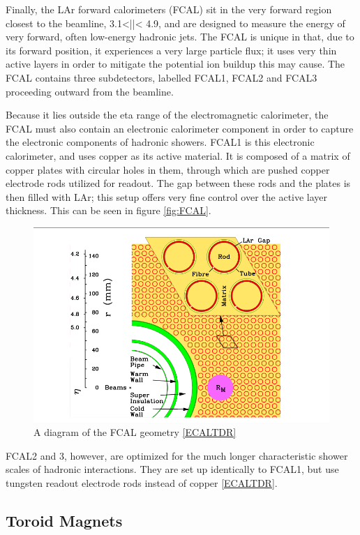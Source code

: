 Finally, the LAr forward calorimeters (FCAL) sit in the very forward region closest to the beamline, 3.1<|\eta |< 4.9, and are designed to measure the energy of very forward, often low-energy hadronic jets.  The FCAL is unique in that, due to its forward position, it experiences a very large particle flux; it uses very thin active layers in order to mitigate the potential ion buildup this may cause.  The FCAL contains three subdetectors, labelled FCAL1, FCAL2 and FCAL3 proceeding outward from the beamline.

Because it lies outside the eta range of the electromagnetic calorimeter, the FCAL must also contain an electronic calorimeter component in order to capture the electronic components of hadronic showers. FCAL1 is this electronic calorimeter, and uses copper as its active material. It is composed of a matrix of copper plates with circular holes in them, through which are pushed copper electrode rods utilized for readout. The gap between these rods and the plates is then filled with LAr; this setup offers very fine control over the active layer thickness. This can be seen in figure \ref{fig:FCAL}.

\begin{figure}
  \includegraphics[width=\linewidth]{figures/detector_chapter/FCAL.png}
  \caption{A diagram of the FCAL geometry \ref{ECALTDR}}
  \label{fig:FCALDiagram}
\end{figure}


FCAL2 and 3, however, are optimized for the much longer characteristic shower scales of hadronic interactions. They are set up identically to FCAL1, but use tungsten readout electrode rods instead of copper \ref{ECALTDR}.

\subsection{Toroid Magnets} \label{sec:toroids}


